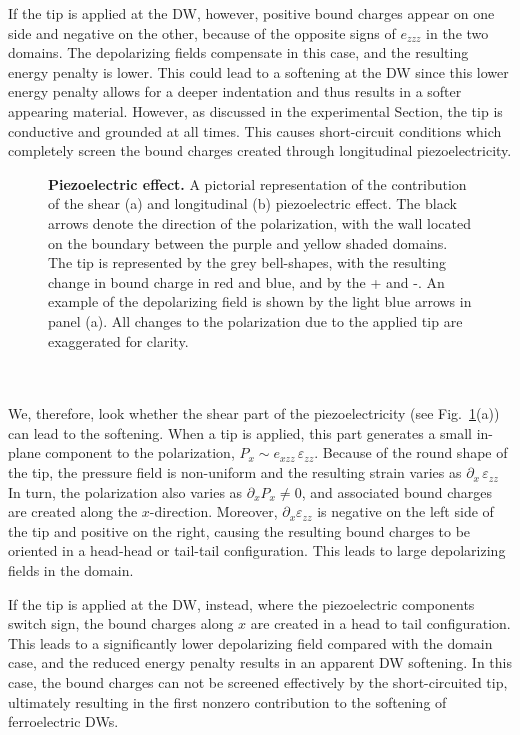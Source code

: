If the tip is applied at the DW, however, positive bound charges appear on one side and negative on the other, because of the opposite signs of $e_{zzz}$ in the two domains.
The depolarizing fields compensate in this case, and the resulting energy penalty is lower.
This could lead to a softening at the DW since this lower energy penalty allows for a deeper indentation and thus results in a softer appearing material.
However, as discussed in the experimental Section, the tip is conductive and grounded at all times.
This causes short-circuit conditions which completely screen the bound charges created through longitudinal piezoelectricity.
\begin{figure}[h]
	\caption{\label{fig:BTO_depolarizing}{\bf Piezoelectric effect.} A pictorial representation of the contribution of the shear (a) and longitudinal (b) piezoelectric effect. The black arrows denote the direction of the polarization, with the wall located on the boundary between the purple and yellow shaded domains. The tip is represented by the grey bell-shapes, with the resulting change in bound charge in red and blue, and by the + and -. An example of the depolarizing field is shown by the light blue arrows in panel (a). All changes to the polarization due to the applied tip are exaggerated for clarity.}
\end{figure}
\\\\
We, therefore, look whether the shear part of the piezoelectricity (see Fig.~\ref{fig:BTO_depolarizing}(a)) can lead to the softening.
When a tip is applied, this part generates a small in-plane component to the polarization, $P_x \sim e_{xzz}\,\varepsilon_{zz}$.
Because of the round shape of the tip, the pressure field is non-uniform and the resulting strain varies as $\partial_x\,\varepsilon_{zz}$
In turn, the polarization also varies as $\partial_x P_x\neq 0$, and associated bound charges are created along the $x$-direction.
Moreover, $\partial_x \varepsilon_{zz}$ is negative on the left side of the tip and positive on the right, causing the resulting bound charges to be oriented in a head-head or tail-tail configuration.
This leads to large depolarizing fields in the domain.

If the tip is applied at the DW, instead, where the piezoelectric components switch sign, the bound charges along $x$ are created in a head to tail configuration.
This leads to a significantly lower depolarizing field compared with the domain case, and the reduced energy penalty results in an apparent DW softening.
In this case, the bound charges can not be screened effectively by the short-circuited tip, ultimately resulting in the first nonzero contribution to the softening of ferroelectric DWs. 

